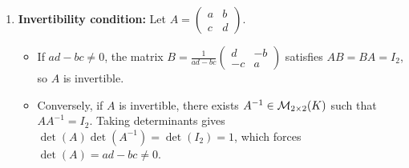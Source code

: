 \begin{exercisesolution}
\label{sol:invertibility_nilpotency_2x2}
\begin{enumerate}[label=\textbf{(\alph*)}]
    \item \textbf{Invertibility condition:}
    Let $A = \left(\begin{smallmatrix} a & b \\ c & d \end{smallmatrix}\right)$.
    \begin{itemize}
        \item If $ad - bc \ne 0$, the matrix $B = \frac{1}{ad-bc} \left(\begin{smallmatrix} d & -b \\ -c & a \end{smallmatrix}\right)$ satisfies $AB = BA = I_2$, so $A$ is invertible.
        \item Conversely, if $A$ is invertible, there exists $A^{-1} \in \mathcal{M}_{2 \times 2}(K)$ such that $A A^{-1} = I_2$. Taking determinants gives $\det(A) \det(A^{-1}) = \det(I_2) = 1$, which forces $\det(A) = ad - bc \ne 0$.
    \end{itemize}


\end{enumerate}
\end{exercisesolution}

